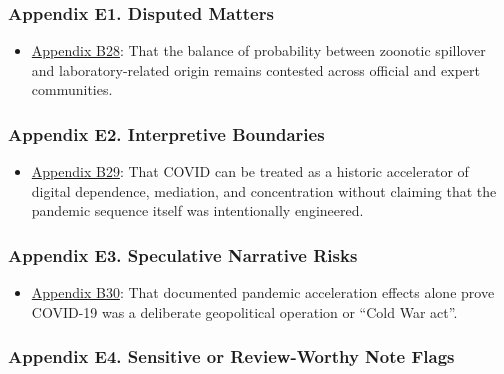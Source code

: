 \documentclass[
  american,
  11pt,
  letterpaper,
]{article}
\providecommand{\tightlist}{%
  \setlength{\itemsep}{0pt}\setlength{\parskip}{0pt}}
\begin{document}
\subsubsection{Appendix E1. Disputed
Matters}\label{ch-03-appendix-e1-disputed-matters}

\begin{itemize}
\tightlist
\item
  \hyperref[ch-03-appendix-b28-the-balance-of-probability-between-zoonotic-spillover-and-laboratory-related-orig]{Appendix
  B28}: That the balance of probability between zoonotic spillover and
  laboratory-related origin remains contested across official and expert
  communities.
\end{itemize}

\subsubsection{Appendix E2. Interpretive
Boundaries}\label{ch-03-appendix-e2-interpretive-boundaries}

\begin{itemize}
\tightlist
\item
  \hyperref[ch-03-appendix-b29-covid-can-be-treated-as-a-historic-accelerator-of-digital-dependence-mediation]{Appendix
  B29}: That COVID can be treated as a historic accelerator of digital
  dependence, mediation, and concentration without claiming that the
  pandemic sequence itself was intentionally engineered.
\end{itemize}

\subsubsection{Appendix E3. Speculative Narrative
Risks}\label{ch-03-appendix-e3-speculative-narrative-risks}

\begin{itemize}
\tightlist
\item
  \hyperref[ch-03-appendix-b30-documented-pandemic-acceleration-effects-alone-prove-covid-19-was-a-deliberate-ge]{Appendix
  B30}: That documented pandemic acceleration effects alone prove
  COVID-19 was a deliberate geopolitical operation or ``Cold War act''.
\end{itemize}

\subsubsection{Appendix E4. Sensitive or Review-Worthy Note
Flags}\label{ch-03-appendix-e4-sensitive-or-review-worthy-note-flags}
\end{document}

